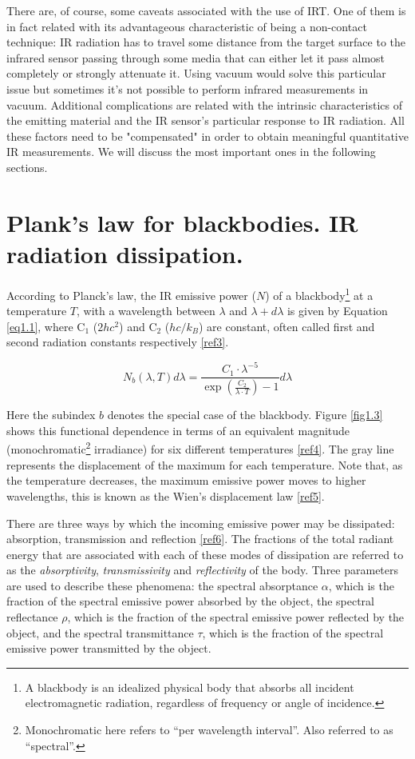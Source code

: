 		There are, of course, some caveats associated with the use of IRT. One of them is in fact related with its advantageous characteristic of being a non-contact technique: IR radiation has to travel some distance from the target surface to the infrared sensor passing through some media that can either let it pass almost completely or strongly attenuate it. Using vacuum would solve this particular issue but sometimes it's not possible to perform infrared measurements in vacuum. Additional complications are related with the intrinsic characteristics of the emitting material and the IR sensor's particular response to IR radiation. All these factors need to be "compensated" in order to obtain meaningful quantitative IR measurements. We will discuss the most important ones in the following sections.
		
	\section{Plank's law for blackbodies. IR radiation dissipation.}\label{section1.2}
	
		According to Planck’s law, the IR emissive power ($N$) of a blackbody\footnote{{\footnotesize A blackbody is an idealized physical body that absorbs all incident electromagnetic radiation, regardless of frequency or angle of incidence.}} at a temperature $T$, with a wavelength between $\lambda$ and $\lambda+d\lambda$ is given by Equation \ref{eq1.1}, where C$_{1}$ ($2hc^2$) and C$_{2}$ ($hc/k_{B}$) are constant, often called first and second radiation constants respectively \ref{ref3}.
		
		\begin{equation}\label{eq1.1}
			N_{b}(\lambda,T)d\lambda=\frac{C_{1} \cdot \lambda^{-5}}{\exp (\frac{C_{2}}{\lambda\cdot T}) -1} d\lambda
		\end{equation}\bigskip
		
		Here the subindex $b$ denotes the special case of the blackbody. Figure \ref{fig1.3} shows this functional dependence in terms of an equivalent magnitude (monochromatic\footnote{{\footnotesize Monochromatic here refers to “per wavelength interval”. Also referred to as “spectral”.}} irradiance) for six different temperatures \ref{ref4}. The gray line represents the displacement of the maximum for each temperature. Note that, as the temperature decreases, the maximum emissive power moves to higher wavelengths, this is known as the Wien’s displacement law \ref{ref5}.
		
		There are three ways by which the incoming emissive power may be dissipated: absorption, transmission and reflection \ref{ref6}. The fractions of the total radiant energy that are associated with each of these modes of dissipation are referred to as the \textit{absorptivity}, \textit{transmissivity} and \textit{reflectivity} of the body. Three parameters are used to describe these phenomena: the spectral absorptance $\alpha$, which is the fraction of the spectral emissive power absorbed by the object, the spectral reflectance $\rho$, which is the fraction of the spectral emissive power reflected by the object, and the spectral transmittance $\tau$, which is the fraction of the spectral emissive power transmitted by the object.
		
